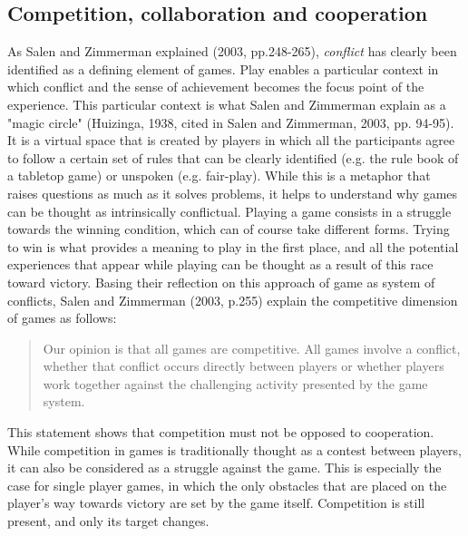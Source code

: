\subsection{Competition, collaboration and cooperation}
As Salen and Zimmerman explained (2003, pp.248-265)\cite{book:rop}, \textit{conflict} has clearly been identified as a defining element of games. Play enables a particular context in which conflict and the sense of achievement becomes the focus point of the experience. This particular context is what Salen and Zimmerman explain as a "magic circle" (Huizinga, 1938, cited in Salen and Zimmerman, 2003, pp. 94-95)\cite{book:rop}. It is a virtual space that is created by players in which all the participants agree to follow a certain set of rules that can be clearly identified (e.g. the rule book of a tabletop game) or unspoken (e.g. fair-play). While this is a metaphor that raises questions as much as it solves problems, it helps to understand why games can be thought as intrinsically conflictual. 
Playing a game consists in a struggle towards the winning condition, which can of course take different forms. Trying to win is what provides a meaning to play in the first place, and all the potential experiences that appear while playing can be thought as a result of this race toward victory. Basing their reflection on this approach of game as system of conflicts, Salen and Zimmerman (2003, p.255)\cite{book:rop} explain the competitive dimension of games as follows:

\begin{quotation}
Our opinion is that all games are competitive. All games involve a conflict, whether that conflict occurs directly between players or whether players work together against the challenging activity presented by the game system.
\end{quotation}

This statement shows that competition must not be opposed to cooperation. While competition in games is traditionally  thought as a contest between players, it can also be considered as a struggle against the game. This is especially the case for single player games, in which the only obstacles that are placed on the player's way towards victory are set by the game itself. Competition is still present, and only its target changes. 

